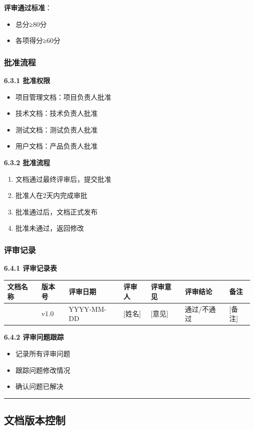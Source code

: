 \documentclass[12pt,a4paper]{article}
\numberwithin{equation}{section}  %
\begin{document}
\textbf{评审通过标准}：
\begin{itemize}
\item 总分≥80分
\item 各项得分≥60分
\end{itemize}

\subsubsection{批准流程}
\textbf{6.3.1 批准权限}
\begin{itemize}
\item 项目管理文档：项目负责人批准
\item 技术文档：技术负责人批准
\item 测试文档：测试负责人批准
\item 用户文档：产品负责人批准
\end{itemize}

\textbf{6.3.2 批准流程}
\begin{enumerate}
\item 文档通过最终评审后，提交批准
\item 批准人在2天内完成审批
\item 批准通过后，文档正式发布
\item 批准未通过，返回修改
\end{enumerate}

\subsubsection{评审记录}
\textbf{6.4.1 评审记录表}

\begin{longtable}{|p{2.29cm}|p{2.29cm}|p{2.29cm}|p{2.29cm}|p{2.29cm}|p{2.29cm}|p{2.29cm}|}
\hline
文档名称 & 版本号 & 评审日期 & 评审人 & 评审意见 & 评审结论 & 备注 \\
\hline
[文档名称] & v1.0 & YYYY-MM-DD & [姓名] & [意见] & 通过/不通过 & [备注] \\
\hline
\end{longtable}

\textbf{6.4.2 评审问题跟踪}
\begin{itemize}
\item 记录所有评审问题
\item 跟踪问题修改情况
\item 确认问题已解决
\end{itemize}

\hrule
\subsection{文档版本控制}
\end{document}

